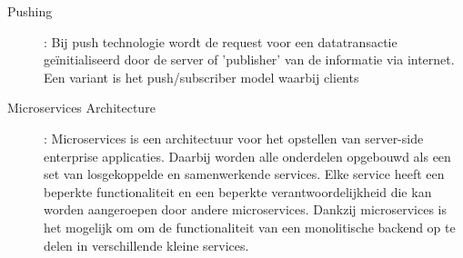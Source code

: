 \begin{description}
\item[Pushing]: Bij push technologie wordt de request voor een datatransactie ge\"initialiseerd door de server of 'publisher' van de informatie via internet. Een variant is het push/subscriber model waarbij clients 
\item[Microservices Architecture]: Microservices is een architectuur voor het opstellen van server-side enterprise applicaties. Daarbij worden alle onderdelen opgebouwd als een set van losgekoppelde en samenwerkende services. Elke service heeft een beperkte functionaliteit en een beperkte verantwoordelijkheid die kan worden aangeroepen door andere microservices. Dankzij microservices is het mogelijk om om de functionaliteit van een monolitische backend op te delen in verschillende kleine services.
\end{description}